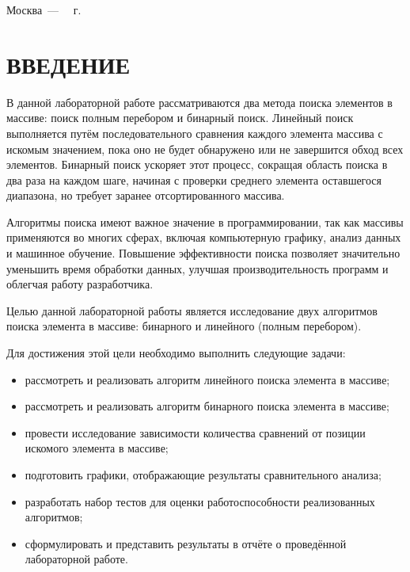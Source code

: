 \documentclass[a4paper, 12pt]{extreport}
\begin{document}
\begin{titlepage}
	\begin{center}
		\vfill
		Москва~---~\the\year
		~г.
	\end{center}
	\restoregeometry
\end{titlepage}

\setcounter{page}{2}

\def\contentsname{\begin{center}\MakeUppercase{СОДЕРЖАНИЕ}\end{center}}
\tableofcontents



\chapter*{ВВЕДЕНИЕ}
В данной лабораторной работе рассматриваются два метода поиска элементов в массиве: поиск полным перебором и бинарный поиск. Линейный поиск выполняется путём последовательного сравнения каждого элемента массива с искомым значением, пока оно не будет обнаружено или не завершится обход всех элементов. Бинарный поиск ускоряет этот процесс, сокращая область поиска в два раза на каждом шаге, начиная с проверки среднего элемента оставшегося диапазона, но требует заранее отсортированного массива.

Алгоритмы поиска имеют важное значение в программировании, так как массивы применяются во многих сферах, включая компьютерную графику, анализ данных и машинное обучение. Повышение эффективности поиска позволяет значительно уменьшить время обработки данных, улучшая производительность программ и облегчая работу разработчика.

Целью данной лабораторной работы является исследование двух алгоритмов поиска элемента в массиве: бинарного и линейного (полным перебором).

Для достижения этой цели необходимо выполнить следующие задачи:
\begin{itemize}
    \item[--] рассмотреть и реализовать алгоритм линейного поиска элемента в массиве;
    \item[--] рассмотреть и реализовать алгоритм бинарного поиска элемента в массиве;
    \item[--] провести исследование зависимости количества сравнений от позиции искомого элемента в массиве;
    \item[--] подготовить графики, отображающие результаты сравнительного анализа;
    \item[--] разработать набор тестов для оценки работоспособности реализованных алгоритмов;
    \item[--] сформулировать и представить результаты в отчёте о проведённой лабораторной работе.
\end{itemize}
\end{document}
